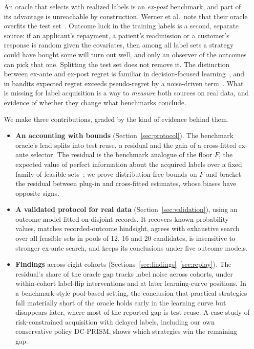 \documentclass[runningheads]{llncs}
\begin{document}
An oracle that selects with realized labels is an \emph{ex-post} benchmark, and part of its advantage is unreachable by construction. Werner et al.\ note that their oracle overfits the test set~\cite{werner2023comparable}. Outcome luck in the training labels is a second, separate source: if an applicant's repayment, a patient's readmission or a customer's response is random given the covariates, then among all label sets a strategy could have bought some will turn out well, and only an observer of the outcomes can pick that one. Splitting the test set does not remove it. The distinction between ex-ante and ex-post regret is familiar in decision-focused learning~\cite{schutte2023robust}, and in bandits expected regret exceeds pseudo-regret by a noise-driven term~\cite{bubeck2012regret,audibert2010regret}. What is missing for label acquisition is a way to \emph{measure} both sources on real data, and evidence of whether they change what benchmarks conclude.

We make three contributions, graded by the kind of evidence behind them.
\begin{itemize}
\item \textbf{An accounting with bounds} (Section~\ref{sec:protocol}). The benchmark oracle's lead splits into test reuse, a residual and the gain of a cross-fitted ex-ante selector. The residual is the benchmark analogue of the floor $F$, the expected value of perfect information about the acquired labels over a fixed family of feasible sets~\cite{howard1966information}; we prove distribution-free bounds on $F$ and bracket the residual between plug-in and cross-fitted estimates, whose biases have opposite signs.
\item \textbf{A validated protocol for real data} (Section~\ref{sec:validation}), using an outcome model fitted on disjoint records. It recovers known-probability values, matches recorded-outcome hindsight, agrees with exhaustive search over all feasible sets in pools of 12, 16 and 20 candidates, is insensitive to stronger ex-ante search, and keeps its conclusions under five outcome models.
\item \textbf{Findings} across eight cohorts (Sections~\ref{sec:findings}--\ref{sec:replay}). The residual's share of the oracle gap tracks label noise across cohorts, under within-cohort label-flip interventions and at later learning-curve positions. In a benchmark-style pool-based setting, the conclusion that practical strategies fall materially short of the oracle holds early in the learning curve but disappears later, where most of the reported gap is test reuse. A case study of risk-constrained acquisition with delayed labels, including our own conservative policy DC-PRISM, shows which strategies win the remaining gap.
\end{itemize}
\end{document}
